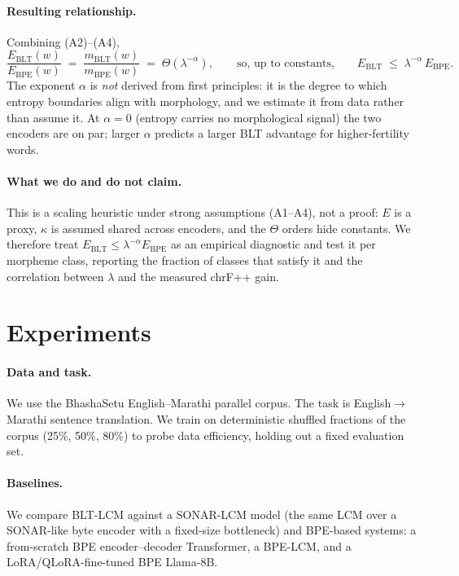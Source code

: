 \documentclass{article}
\begin{document}
\paragraph{Resulting relationship.}
Combining (A2)--(A4),
\[
\frac{E_{\mathrm{BLT}}(w)}{E_{\mathrm{BPE}}(w)} \;=\; \frac{m_{\mathrm{BLT}}(w)}{m_{\mathrm{BPE}}(w)} \;=\; \Theta\!\left(\lambda^{-\alpha}\right),
\qquad\text{so, up to constants,}\qquad E_{\mathrm{BLT}} \;\le\; \lambda^{-\alpha}\, E_{\mathrm{BPE}}.
\]
The exponent $\alpha$ is \emph{not} derived from first principles: it is the degree to which entropy boundaries align with morphology, and we estimate it from data rather than assume it. At $\alpha=0$ (entropy carries no morphological signal) the two encoders are on par; larger $\alpha$ predicts a larger BLT advantage for higher-fertility words.

\paragraph{What we do and do not claim.}
This is a scaling heuristic under strong assumptions (A1--A4), not a proof: $E$ is a proxy, $\kappa$ is assumed shared across encoders, and the $\Theta$ orders hide constants. We therefore treat $E_{\mathrm{BLT}} \le \lambda^{-\alpha} E_{\mathrm{BPE}}$ as an empirical diagnostic and test it per morpheme class, reporting the fraction of classes that satisfy it and the correlation between $\lambda$ and the measured chrF++ gain.

\section{Experiments}
\label{sec:experiments}

\paragraph{Data and task.}
We use the BhashaSetu English--Marathi parallel corpus. The task is English$\rightarrow$Marathi sentence translation. We train on deterministic shuffled fractions of the corpus (25\%, 50\%, 80\%) to probe data efficiency, holding out a fixed evaluation set.

\paragraph{Baselines.}
We compare BLT-LCM against a SONAR-LCM model (the same LCM over a SONAR-like byte encoder with a fixed-size bottleneck) and BPE-based systems: a from-scratch BPE encoder--decoder Transformer, a BPE-LCM, and a LoRA/QLoRA-fine-tuned BPE Llama-8B.
\end{document}
